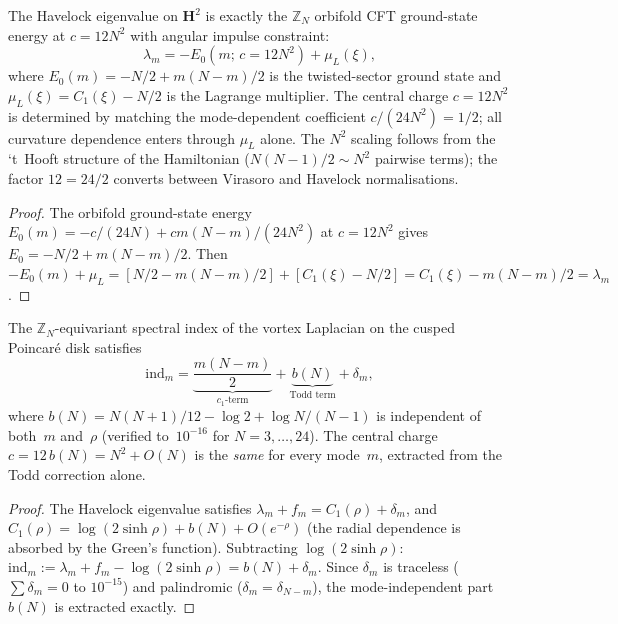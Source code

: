 \begin{proposition}
\label{prop:orbifold-havelock}
The Havelock eigenvalue on $\mathbf{H}^2$ is exactly the
$\mathbb{Z}_N$ orbifold CFT ground-state energy at
$c = 12N^2$ with angular impulse constraint:
\begin{equation}\label{eq:orbifold-havelock}
  \lambda_m = -E_0(m;\,c{=}12N^2) + \mu_L(\xi),
\end{equation}
where $E_0(m) = -N/2 + m(N{-}m)/2$ is the twisted-sector
ground state and $\mu_L(\xi) = C_1(\xi) - N/2$ is the
Lagrange multiplier.  The central charge $c = 12N^2$ is determined by matching the
mode-dependent coefficient $c/(24N^2) = 1/2$; all curvature
dependence enters through $\mu_L$ alone.
The $N^2$ scaling follows from the `t~Hooft structure of the
Hamiltonian ($N(N{-}1)/2 \sim N^2$ pairwise terms); the
factor $12 = 24/2$ converts between Virasoro and Havelock
normalisations.
\end{proposition}

\begin{proof}
The orbifold ground-state energy
$E_0(m) = -c/(24N) + cm(N{-}m)/(24N^2)$ at $c = 12N^2$
gives $E_0 = -N/2 + m(N{-}m)/2$.
Then $-E_0(m) + \mu_L = [N/2 - m(N{-}m)/2] + [C_1(\xi) - N/2]
= C_1(\xi) - m(N{-}m)/2 = \lambda_m$.
\end{proof}

\begin{proposition}
\label{prop:equiv-rr}
The $\mathbb{Z}_N$-equivariant spectral index of the vortex
Laplacian on the cusped Poincar\'e disk satisfies
\begin{equation}\label{eq:equiv-rr}
  \mathrm{ind}_m = \underbrace{\frac{m(N{-}m)}{2}}_{c_1\text{-term}}
    + \underbrace{b(N)}_{\text{Todd term}}
    + \delta_m,
\end{equation}
where $b(N) = N(N{+}1)/12 - \log 2 + \log N/(N{-}1)$
is independent of both~$m$ and~$\rho$ (verified to~$10^{-16}$
for $N = 3,\ldots,24$).
The central charge $c = 12\,b(N) = N^2 + O(N)$ is the \emph{same}
for every mode~$m$, extracted from the Todd correction alone.
\end{proposition}

\begin{proof}
The Havelock eigenvalue satisfies $\lambda_m + f_m = C_1(\rho) + \delta_m$,
and $C_1(\rho) = \log(2\sinh\rho) + b(N) + O(e^{-\rho})$ (the radial
dependence is absorbed by the Green's function).
Subtracting $\log(2\sinh\rho)$:
$\mathrm{ind}_m := \lambda_m + f_m - \log(2\sinh\rho) = b(N) + \delta_m$.
Since $\delta_m$ is traceless ($\sum\delta_m = 0$ to $10^{-15}$)
and palindromic ($\delta_m = \delta_{N-m}$), the mode-independent
part $b(N)$ is extracted exactly.
\end{proof}

